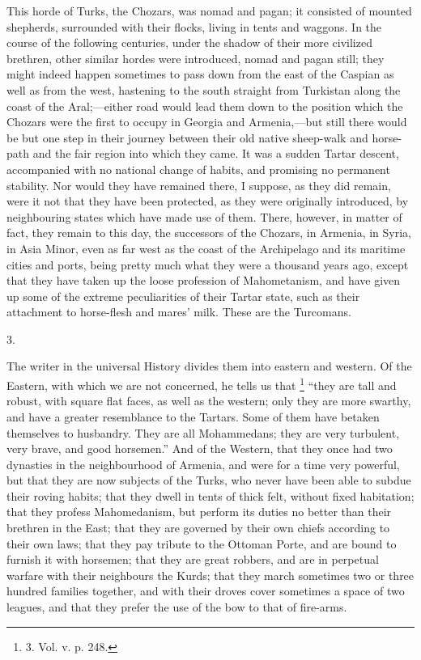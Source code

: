 This horde of Turks, the
Chozars, was nomad and pagan; it consisted of mounted shepherds,
surrounded with their flocks, living in tents and waggons. In the
course of the following centuries, under the shadow of their more
civilized brethren, other similar hordes were introduced, nomad and
pagan still; they might indeed happen sometimes to pass down from the
east of the Caspian as well as from the west, hastening to the south
straight from Turkistan along the coast of the Aral;—either road
would lead them down to the position which the Chozars were the first
to occupy in Georgia and Armenia,—but still there would be but one
step in their journey between their old native sheep-walk and
horse-path and the fair region into which they came. It was a sudden
Tartar descent, accompanied with no national change of habits, and
promising no permanent stability. Nor would they have remained there,
I suppose, as they did remain, were it not that they have been
protected, as they were originally introduced, by neighbouring states which have made use of them. There, however, in
matter of fact, they remain to this day, the successors of the Chozars,
in Armenia, in Syria, in Asia Minor, even as far west as the coast of
the Archipelago and its maritime cities and ports, being pretty much
what they were a thousand years ago, except that they have taken up
the loose profession of Mahometanism, and have given up some of the
extreme peculiarities of their Tartar state, such as their attachment
to horse-flesh and mares' milk. These are the Turcomans.

3.

The writer in the universal
History divides them into eastern and western. Of the Eastern, with
which we are not concerned, he tells us that \footnote{3.
Vol. v. p. 248.} ``they are tall and robust, with square flat faces, as well as
the western; only they are more swarthy, and have a greater
resemblance to the Tartars. Some of them have betaken themselves to
husbandry. They are all Mohammedans; they are very turbulent, very
brave, and good horsemen.'' And of the Western, that they once had two
dynasties in the neighbourhood of Armenia, and were for a time very
powerful, but that they are now subjects of the Turks, who never have
been able to subdue their roving habits; that they dwell in tents of
thick felt, without fixed habitation; that they profess Mahomedanism,
but perform its duties no better than their brethren in the East; that
they are governed by their own chiefs according to their own laws;
that they pay tribute to the Ottoman Porte, and are bound to furnish
it with horsemen; that they are great robbers, and are in perpetual
warfare with their neighbours the Kurds; that they march
sometimes two or three hundred families together, and with their
droves cover sometimes a space of two leagues, and that they prefer
the use of the bow to that of fire-arms.

